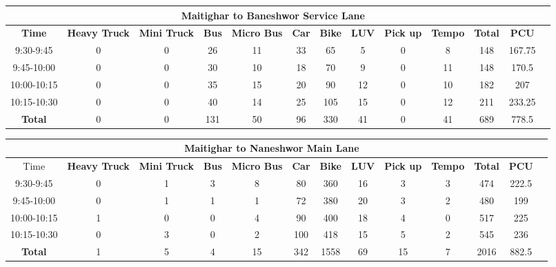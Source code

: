 \begin{landscape}
\centering
\begin{table}[h!]
\centering
\begin{tabular}{|c|c|c|c|c|c|c|c|c|c|c|c|c|}
    \hline
    \multicolumn{12}{|c|}{\textbf{Maitighar to Baneshwor Service Lane}} \\
    \hline
    \textbf{Time} & \textbf{Heavy Truck} & \textbf{Mini Truck} & \textbf{Bus} & \textbf{Micro Bus} & \textbf{Car} & \textbf{Bike} & \textbf{LUV} & \textbf{Pick up} & \textbf{Tempo} & \textbf{\textbf{Total}} & \textbf{PCU} \\
    \hline
    9:30-9:45	&0	&0	&26	&11	&33	&65	&5	&0	&8	&148	&167.75 \\ \hline
    9:45-10:00	&0	&0	&30	&10	&18	&70	&9	&0	&11	&148	&170.5 \\ \hline
    10:00-10:15	&0	&0	&35	&15	&20	&90	&12	&0	&10	&182	&207 \\ \hline
    10:15-10:30	&0	&0	&40	&14	&25	&105	&15	&0	&12	&211	&233.25 \\ \hline
    \textbf{Total} & 0 & 0 & 131 & 50 & 96 & 330 & 41 & 0 & 41 & 689 & 778.5 \\ \hline

\end{tabular}

\vspace{0.5cm}

\begin{tabular}{|c|c|c|c|c|c|c|c|c|c|c|c|c|}
    \hline
    \multicolumn{12}{|c|}{\textbf{Maitighar to Naneshwor Main Lane}} \\
    \hline
        Time & \textbf{Heavy Truck} & \textbf{Mini Truck} & \textbf{Bus} & \textbf{Micro Bus} & \textbf{Car} & \textbf{Bike} & \textbf{LUV} & \textbf{Pick up} & \textbf{Tempo} & \textbf{\textbf{Total}} & \textbf{PCU} \\
    \hline
    9:30-9:45	&0	&1	&3	&8	&80	&360	&16	&3	&3	&474	&222.5 \\ \hline
    9:45-10:00	&0	&1	&1	&1	&72	&380	&20	&3	&2	&480	&199 \\ \hline
    10:00-10:15	&1	&0	&0	&4	&90	&400	&18	&4	&0	&517	&225 \\ \hline
    10:15-10:30	&0	&3	&0	&2	&100	&418	&15	&5	&2	&545	&236 \\ \hline
    \textbf{Total} & 1 & 5 & 4 & 15 & 342 & 1558 & 69 & 15 & 7 & 2016 & 882.5 \\ \hline

\end{tabular}


\end{table}
\end{landscape}
